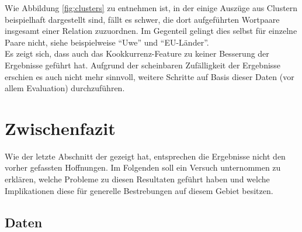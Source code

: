 Wie Abbildung \ref{fig:clusters} zu entnehmen ist, in der einige Auszüge aus Clustern beispielhaft dargestellt sind,
fällt es schwer, die dort aufgeführten Wortpaare insgesamt einer Relation zuzuordnen. Im Gegenteil gelingt dies selbst für
einzelne Paare nicht, siehe beispielweise ``Uwe'' und ``EU-Länder''.\\
Es zeigt sich, dass auch das Kookkurrenz-Feature zu keiner Besserung der Ergebnisse geführt hat. Aufgrund der scheinbaren
Zufälligkeit der Ergebnisse erschien es auch nicht mehr sinnvoll, weitere Schritte auf Basis dieser Daten (vor allem Evaluation)
durchzuführen.\\

\section{Zwischenfazit}\label{sec:zwi-dis}

Wie der letzte Abschnitt der gezeigt hat, entsprechen die Ergebnisse nicht den vorher gefassten Hoffnungen.
Im Folgenden soll ein Versuch unternommen zu erklären, welche Probleme zu diesen Resultaten geführt haben und welche
Implikationen diese für generelle Bestrebungen auf diesem Gebiet besitzen.

\subsection{Daten}\label{sec:zwi-dis-data}

